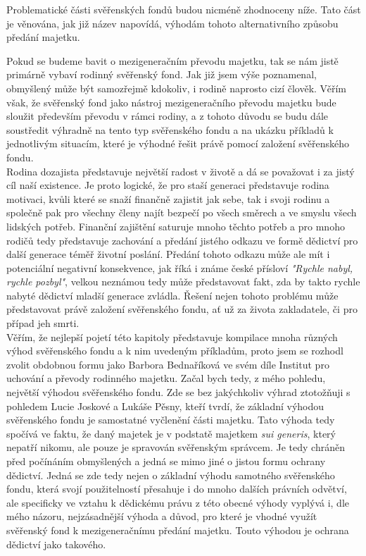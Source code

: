 \documentclass{article}
\begin{document}
 Problematické části svěřenských fondů budou nicméně zhodnoceny níže. Tato část je věnována, jak již název napovídá, výhodám tohoto alternativního způsobu předání majetku. 
 
 Pokud se budeme bavit o mezigeneračním převodu majetku, tak se nám jistě primárně vybaví rodinný svěřenský fond. Jak již jsem výše poznamenal, obmyšlený může být samozřejmě kdokoliv, i rodině naprosto cizí člověk. Věřím však, že svěřenský fond jako nástroj mezigeneračního převodu majetku bude sloužit především převodu v rámci rodiny, a z tohoto důvodu se budu dále soustředit výhradně na tento typ svěřenského fondu a na ukázku příkladů k jednotlivým situacím, které je výhodné řešit právě pomocí založení svěřenského fondu.\\
 
 
 Rodina dozajista představuje největší radost v životě a dá se považovat i za jistý cíl naší existence. Je proto logické, že pro staší generaci představuje rodina motivaci, kvůli které se snaží finančně zajistit jak sebe, tak i svoji rodinu a společně pak pro všechny členy najít bezpečí po všech směrech a ve smyslu všech lidských potřeb. Finanční zajištění saturuje mnoho těchto potřeb a pro mnoho rodičů tedy představuje zachování a předání jistého odkazu ve formě dědictví pro další generace téměř životní poslání. Předání tohoto odkazu může ale mít i potenciální negativní konsekvence, jak říká i známe české přísloví \textit{"Rychle nabyl, rychle pozbyl"}, velkou neznámou tedy může představovat fakt, zda by takto rychle nabyté dědictví mladší generace zvládla. Řešení nejen tohoto problému může představovat právě založení svěřenského fondu, ať už za života zakladatele, či pro případ jeh smrti.\\
 
 Věřím, že nejlepší pojetí této kapitoly představuje kompilace mnoha různých výhod svěřenského fondu a k nim uvedeným příkladům, proto jsem se rozhodl zvolit obdobnou formu jako Barbora Bednaříková ve svém díle Institut pro uchování a převody rodinného majetku. Začal bych tedy, z mého pohledu, největší výhodou svěřenského fondu. Zde se bez jakýchkoliv výhrad ztotožňuji s pohledem Lucie Joskové a Lukáše Pěsny, kteří tvrdí, že základní výhodou svěřenského fondu je samostatné vyčlenění části majetku. Tato výhoda tedy spočívá ve faktu, že daný majetek je v podstatě majetkem \textit{sui generis}, který nepatří nikomu, ale pouze je spravován svěřenským správcem. Je tedy chráněn před počínáním obmyšlených a jedná se mimo jiné o jistou formu ochrany dědictví. Jedná se zde tedy nejen o základní výhodu samotného svěřenského fondu, která svojí použitelností přesahuje i do mnoho dalších právních odvětví, ale specificky ve vztahu k dědickému právu z této obecné výhody vyplývá i, dle mého názoru, nejzásadnější výhoda a důvod, pro které je vhodné využít svěřenský fond k mezigeneračnímu předání majetku. Touto výhodou je ochrana dědictví jako takového.\\
 
\end{document}
